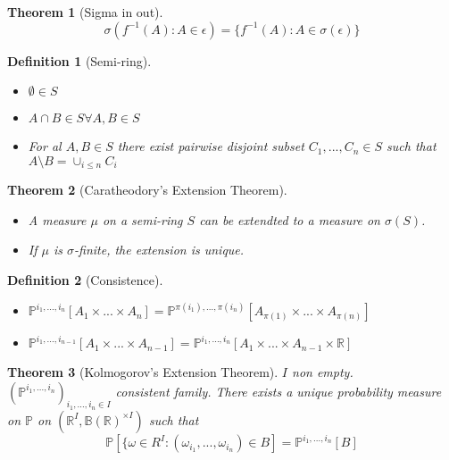 \documentclass{article}
\newtheorem{theorem}{Theorem}
\newtheorem{definition}{Definition}
\begin{document}
\begin{theorem}[Sigma in out]
  $$\sigma(f^{-1}(A): A \in \epsilon) = \{ f^{-1}(A): A \in \sigma(\epsilon) \}$$
\end{theorem}
\begin{definition}[Semi-ring]
  \begin{itemize}
  \item $\emptyset \in S$
  \item $A \cap B \in S \forall A, B \in S$
  \item For al $A, B \in S$ there exist pairwise disjoint subset $C_1, ..., C_n \in S$ such that $A \setminus B = \cup_{i \le n} C_i$
  \end{itemize}
\end{definition}
\begin{theorem}[Caratheodory's Extension Theorem]
  \begin{itemize}
  \item A measure $\mu$ on a semi-ring $S$ can be extendted to a
    measure on $\sigma(S)$.
  \item If $\mu$ is $\sigma$-finite, the extension is unique.
  \end{itemize}
\end{theorem}
\begin{definition}[Consistence]
  \begin{itemize}
  \item $\mathbb P^{i_1, ..., i_n}[A_1 \times ... \times A_n] = \mathbb P^{\pi(i_1), ... , \pi(i_n)}[A_{\pi(1)} \times ... \times A_{\pi(n)}]$
  \item $\mathbb P^{i_1, ..., i_{n-1}}[A_1 \times ... \times A_{n-1}] = \mathbb P^{i_1, ..., i_n}[A_1 \times ... \times A_{n-1} \times \mathbb R] $
  \end{itemize}
\end{definition}
\begin{theorem}[Kolmogorov's Extension Theorem]
  $I$ non empty.
  $(\mathbb P^{i_1, ..., i_n})_{i_1, ..., i_n \in I}$ consistent family. There exists a unique probability measure on $\mathbb P$ on $(\mathbb R^I, \mathbb B(\mathbb R)^{\times I})$ such that
  $$\mathbb P[\{ \omega \in R^I: (\omega_{i_1}, ..., \omega_{i_n}) \in B] = \mathbb P^{i_1, ..., i_n}[B]$$
\end{theorem}
\end{document}
